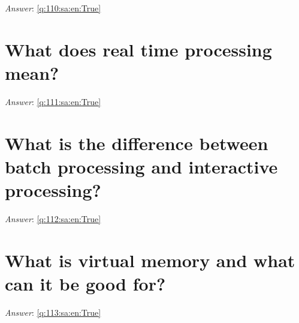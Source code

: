 \documentclass[a4paper,11pt,oneside]{book}
\begin{document}
\begin{sloppypar}
\label{q:110:sa:en:False}

\vspace{2cm}

\noindent\makebox[\textwidth]{\hrulefill}

\vspace{1cm}

\textit{Answer}: \autoref{q:110:sa:en:True}



\section{What does real time processing mean?}

\label{q:111:sa:en:False}

\vspace{2cm}

\noindent\makebox[\textwidth]{\hrulefill}

\vspace{1cm}

\textit{Answer}: \autoref{q:111:sa:en:True}



\section{What is the difference between batch processing and interactive processing?}

\label{q:112:sa:en:False}

\vspace{2cm}

\noindent\makebox[\textwidth]{\hrulefill}

\vspace{1cm}

\textit{Answer}: \autoref{q:112:sa:en:True}



\section{What is virtual memory and what can it be good for?}

\label{q:113:sa:en:False}

\vspace{2cm}

\noindent\makebox[\textwidth]{\hrulefill}

\vspace{1cm}

\textit{Answer}: \autoref{q:113:sa:en:True}




\end{sloppypar}
\end{document}
